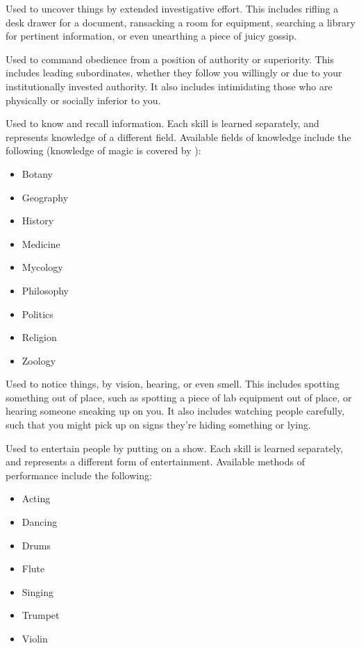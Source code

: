 
Used to uncover things by extended investigative effort.
This includes rifling a desk drawer for a document, ransacking a room for equipment, searching a library for pertinent information, or even unearthing a piece of juicy gossip.


Used to command obedience from a position of authority or superiority.
This includes leading subordinates, whether they follow you willingly or due to your institutionally invested authority.
It also includes intimidating those who are physically or socially inferior to you.


Used to know and recall information.
Each  skill is learned separately, and represents knowledge of a different field.
Available fields of knowledge include the following (knowledge of magic is covered by {\magicskills}):
\begin{itemize}
	\item Botany
	\item Geography
	\item History
	\item Medicine
	\item Mycology %
	\item Philosophy
	\item Politics
	\item Religion
	\item Zoology
\end{itemize}


Used to notice things, by vision, hearing, or even smell.
This includes spotting something out of place, such as spotting a piece of lab equipment out of place, or hearing someone sneaking up on you.
It also includes watching people carefully, such that you might pick up on signs they're hiding something or lying.


Used to entertain people by putting on a show.
Each  skill is learned separately, and represents a different form of entertainment.
Available methods of performance include the following:
\begin{itemize}
	\item Acting
	\item Dancing
	\item Drums
	\item Flute
	\item Singing
	\item Trumpet
	\item Violin
\end{itemize}

